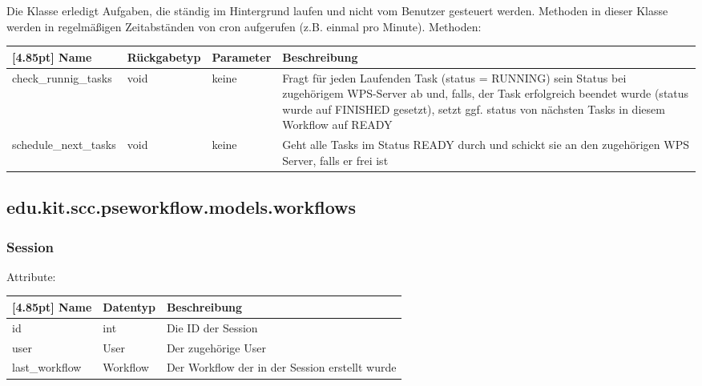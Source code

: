         Die Klasse erledigt Aufgaben, die ständig im Hintergrund laufen und nicht vom Benutzer gesteuert werden. Methoden in dieser Klasse werden in regelmäßigen Zeitabständen von cron  aufgerufen (z.B. einmal pro Minute).
        \newline\newline
        Methoden:
        \begin{center}
        	\setlength\tabcolsep{5pt}
        	\renewcommand{\arraystretch}{1.5}
        	
        	\begin{tabularx}{\textwidth}{|l|l|l|X|}
        		\hline
        		\rowcolor[gray]{0.90}[4.85pt]
        		Name & Rückgabetyp & Parameter & Beschreibung \\ \hline
        		check_runnig_tasks & void & keine & Fragt für jeden Laufenden Task (status = RUNNING) sein Status bei zugehörigem WPS-Server ab und, falls, der Task erfolgreich beendet wurde (status wurde auf FINISHED gesetzt), setzt ggf. status von nächsten Tasks in diesem Workflow auf READY \\ \hline
        		schedule_next_tasks & void & keine & Geht alle Tasks im Status READY durch und schickt sie an den zugehörigen WPS Server, falls er frei ist \\ \hline
        	\end{tabularx}
        \end{center}


    \subsection{edu.kit.scc.pseworkflow.models.workflows}
    
        \subsubsection{Session}
        
        Attribute:
		\begin{center}
        	\renewcommand{\arraystretch}{1.5}
            \setlength\tabcolsep{5pt}
        	\begin{tabularx}{\textwidth}{|l|l|X|}
        		\hline
                \rowcolor[gray]{0.75}[4.85pt]            		
        	    Name & Datentyp & Beschreibung \\ \hline
        	    id & int & Die ID der Session \\ \hline
        	    user & User & Der zugehörige User \\ \hline
        	    last_workflow & Workflow & Der Workflow der in der Session erstellt wurde \\ \hline
        	\end{tabularx}
        \end{center}
        
